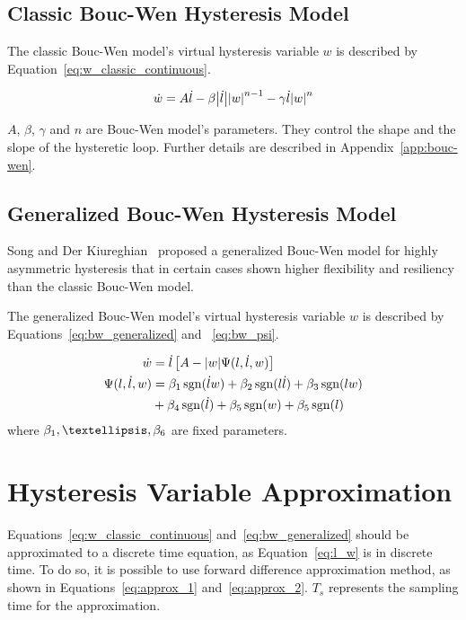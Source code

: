 \subsection{Classic Bouc-Wen Hysteresis Model}
The classic Bouc-Wen model's virtual hysteresis variable $w$ is described by Equation~\ref{eq:w_classic_continuous}.

\begin{align}
\dot{w} = A\dot{l} - \beta \abs{\dot{l}} \abs{w}^{n-1} - \gamma \dot{l} \abs{w}^n
\label{eq:w_classic_continuous}
\end{align}

$A$, $\beta$, $\gamma$ and $n$ are Bouc-Wen model's parameters.
They control the shape and the slope of the hysteretic loop.
Further details are described in Appendix~\ref{app:bouc-wen}.

\subsection{Generalized Bouc-Wen Hysteresis Model}
Song and Der Kiureghian~\cite{song2006generalized} proposed a generalized Bouc-Wen model for highly asymmetric
hysteresis that in certain cases shown higher flexibility
and resiliency than the classic Bouc-Wen model.

The generalized Bouc-Wen model's virtual hysteresis variable $w$
is described by Equations~\ref{eq:bw_generalized} and ~\ref{eq:bw_psi}.


\begin{align}
\dot{w} &= \dot{l} \left[A - \abs{w} \Psi(l, \dot{l}, w)\right] \label{eq:bw_generalized}\\
\Psi(l, \dot{l}, w) &= \beta_1 \operatorname{sgn}(\dot{l}w) + \beta_2 \operatorname{sgn}(l\dot{l}) + \beta_3 \operatorname{sgn}(lw) \nonumber \\
&+ \beta_4 \operatorname{sgn}(\dot{l}) + \beta_5 \operatorname{sgn}(w) + \beta_5 \operatorname{sgn}(l) \label{eq:bw_psi}
\end{align}
where $\beta_1,\textellipsis,\beta_6$ are fixed parameters.
\section{Hysteresis Variable Approximation}
Equations~\ref{eq:w_classic_continuous} and~\ref{eq:bw_generalized} should be approximated to a discrete time equation, as Equation~\ref{eq:l_w} is in discrete time. To do so, it is possible to use forward
difference approximation method, as shown in Equations~\ref{eq:approx_1} and~\ref{eq:approx_2}. $T_s$ represents the sampling time for the approximation.

